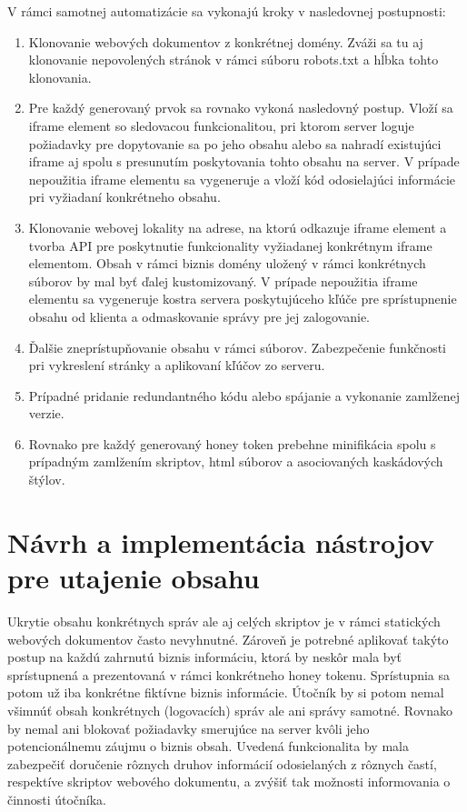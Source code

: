 \documentclass[conference, 11pt,slovak,a4paper,twoside]{IEEEtran}
\begin{document}
V rámci samotnej automatizácie sa vykonajú kroky v nasledovnej postupnosti:
\begin{enumerate}
	\item Klonovanie webových dokumentov z konkrétnej domény. Zváži sa tu aj klonovanie nepovolených stránok v rámci súboru robots.txt a hĺbka tohto klonovania.

	\item Pre každý generovaný prvok sa rovnako vykoná nasledovný postup. Vloží sa iframe element so sledovacou funkcionalitou, pri ktorom server loguje požiadavky pre dopytovanie sa po jeho obsahu alebo sa nahradí existujúci iframe aj spolu s presunutím poskytovania tohto obsahu na server. V prípade nepoužitia iframe elementu sa vygeneruje a vloží kód odosielajúci informácie pri vyžiadaní konkrétneho obsahu.
	
	\item Klonovanie webovej lokality na adrese, na ktorú odkazuje iframe element a tvorba API pre poskytnutie funkcionality vyžiadanej konkrétnym iframe elementom. Obsah v rámci biznis domény uložený v rámci konkrétnych súborov by mal byť ďalej kustomizovaný. V prípade nepoužitia iframe elementu sa vygeneruje kostra servera poskytujúceho kľúče pre sprístupnenie obsahu od klienta a odmaskovanie správy pre jej zalogovanie.
	
	\item Ďalšie zneprístupňovanie obsahu v rámci súborov. Zabezpečenie funkčnosti pri vykreslení stránky a aplikovaní kľúčov zo serveru.
	
	\item Prípadné pridanie redundantného kódu alebo spájanie a vykonanie zamlženej verzie.
	
	\item Rovnako pre každý generovaný honey token prebehne minifikácia spolu s prípadným zamlžením skriptov, html súborov a asociovaných kaskádových štýlov. 
\end{enumerate}


\section{Návrh a implementácia nástrojov pre utajenie obsahu} \label{designAndImplementationOfConcealingTools}

Ukrytie obsahu konkrétnych správ ale aj celých skriptov je v rámci statických webových dokumentov často nevyhnutné. Zároveň je potrebné aplikovať takýto postup na každú zahrnutú biznis informáciu, ktorá by neskôr mala byť sprístupnená a prezentovaná v rámci konkrétneho honey tokenu. Sprístupnia sa potom už iba konkrétne fiktívne biznis informácie. Útočník by si potom nemal všimnúť obsah konkrétnych (logovacích) správ ale ani správy samotné. Rovnako by nemal ani blokovať požiadavky smerujúce na server kvôli jeho potencionálnemu záujmu o biznis obsah. Uvedená funkcionalita by mala zabezpečiť doručenie rôznych druhov informácií odosielaných z rôznych častí, respektíve skriptov webového dokumentu, a zvýšiť tak možnosti informovania o činnosti útočníka.
\end{document}
